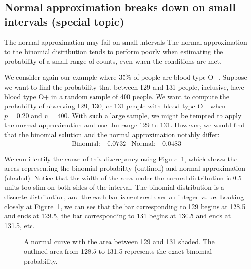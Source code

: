 \subsection{Normal approximation breaks down on small intervals (special topic)}

\begin{onebox}{The normal approximation may fail on small intervals}
{The normal approximation to the binomial distribution tends to perform poorly when estimating the probability of a small range of counts, even when the conditions are met.}
\end{onebox}

We consider again our example where 35\% of people are blood type O+.  Suppose we want to find the probability that between 129 and 131 people, inclusive, have blood type O+ in a random sample of 400 people.  We want to compute the probability of observing 129, 130, or 131 people with blood type O+ when $p=0.20$ and $n=400$.  With such a large sample, we might be tempted to apply the normal approximation and use the range 129 to 131. However, we would find that the binomial solution and the normal approximation notably differ:
\begin{align*}
\text{Binomial:}&\ 0.0732
&\text{Normal:}&\ 0.0483
\end{align*}
\D{\newpage}

We can identify the cause of this discrepancy using Figure~\ref{normApproxToBinomFail}, which shows the areas representing the binomial probability (outlined) and normal approximation (shaded). Notice that the width of the area under the normal distribution is 0.5 units too slim on both sides of the interval. The binomial distribution is a discrete distribution, and the each bar is centered over an integer value. Looking closely at Figure~\ref{normApproxToBinomFail}, we can see that the bar corresponding to 129 begins at 128.5 and ends at 129.5, the bar corresponding to 131 begins at 130.5 and ends at 131.5, etc.

\begin{figure}[h]
\centering
\caption{A normal curve with the area between 129 and 131 shaded. The outlined area from 128.5 to 131.5 represents the exact binomial probability.}
\label{normApproxToBinomFail}
\end{figure}



